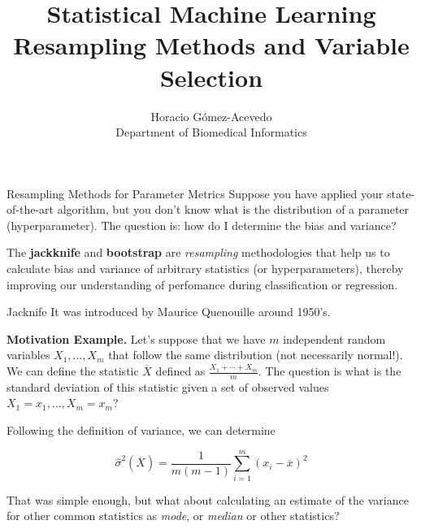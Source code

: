 \documentclass{beamer}
\title{Statistical Machine Learning\\ Resampling Methods and Variable Selection}
\author{Horacio G\'omez-Acevedo\\ Department of Biomedical Informatics}
\begin{document}
	\begin{frame}[plain]
		\maketitle
	\end{frame}


\begin{frame}{Resampling Methods for Parameter Metrics}
	Suppose you have applied your state-of-the-art algorithm, but you don't know what is the distribution of a parameter (hyperparameter). The question is: how do I determine the bias and variance?
	
	The {\bf jackknife} and {\bf bootstrap} are {\it resampling} methodologies that help us to calculate bias and variance of arbitrary statistics (or hyperparameters), thereby improving our understanding of perfomance during classification or regression.
	
	
	 
\end{frame}

\begin{frame}{Jacknife}
	It was introduced by Maurice Quenouille around 1950's. 
	
	{\bf Motivation Example. } Let's suppose that we have 
	$m$ independent random variables $X_1,\ldots, X_m$ that follow the same distribution (not necessarily normal!). We can define the statistic $\overline{X}$ defined as $\frac{X_1 + \cdots + X_m}{m}$. The question is what is the standard deviation of this statistic given a set of observed values $X_1=x_1,\ldots, X_m=x_m$?
	
	Following the definition of variance, we can determine
	
	\begin{equation}
		\widehat{\sigma}^2(\overline{X})= \frac{1}{m(m-1)} \sum_{i=1}^m (x_i - \overline{x})^2
		\label{eq:stdev}
	\end{equation}
	
	That was simple enough, but what about calculating an estimate of the variance for other common statistics as  {\it mode}, or {\it median} or other statistics?
	
\end{frame}
\end{document}
